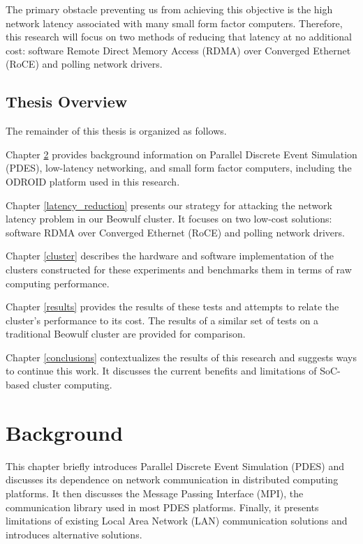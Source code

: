 \documentclass[11pt]{book}
\begin{document}
The primary obstacle preventing us from achieving this objective is the high
network latency associated with many small form factor computers. Therefore,
this research will focus on two methods of reducing that latency at no
additional cost: software Remote Direct Memory Access (RDMA) over Converged
Ethernet (RoCE) and polling network drivers.

\section{\textbf{Thesis Overview}}

The remainder of this thesis is organized as follows.

Chapter \ref{background} provides background information on Parallel Discrete
Event Simulation (PDES), low-latency networking, and small form factor
computers, including the ODROID platform used in this research.

Chapter \ref{latency_reduction} presents our strategy for attacking the network
latency problem in our Beowulf cluster. It focuses on two low-cost solutions:
software RDMA over Converged Ethernet (RoCE) and polling network drivers.

Chapter \ref{cluster} describes the hardware and software implementation of the
clusters constructed for these experiments and benchmarks them in terms of raw
computing performance.

Chapter \ref{results} provides the results of these tests and attempts to relate
the cluster's performance to its cost. The results of a similar set of tests on
a traditional Beowulf cluster are provided for comparison.

Chapter \ref{conclusions} contextualizes the results of this research and
suggests ways to continue this work. It discusses the current benefits and
limitations of SoC-based cluster computing.

\newpage
\chapter{Background}
\label{background}

This chapter briefly introduces Parallel Discrete Event Simulation (PDES) and
discusses its dependence on network communication in distributed computing
platforms. It then discusses the Message Passing Interface (MPI), the
communication library used in most PDES platforms. Finally, it presents
limitations of existing Local Area Network (LAN) communication solutions and
introduces alternative solutions.
\end{document}
